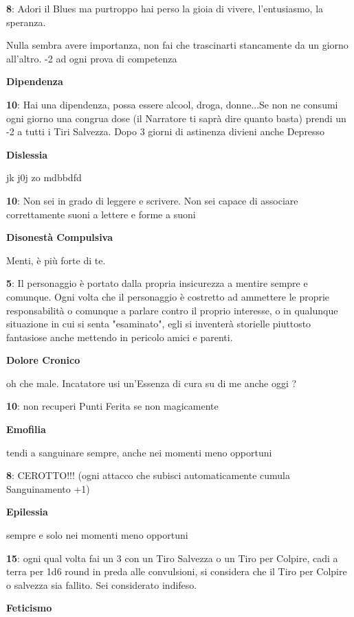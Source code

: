 \documentclass[a4paper,11pt,twoside,openany]{book}
\begin{document}
\textbf{8}: Adori il Blues ma purtroppo hai perso la gioia di vivere, l'entusiasmo, la speranza.

Nulla sembra avere importanza, non fai che trascinarti stancamente da un giorno all'altro. -2 ad ogni prova di competenza

\textbf{Dipendenza}

\textbf{10}: Hai una dipendenza, possa essere alcool, droga, donne...Se non ne consumi ogni giorno una congrua dose (il Narratore ti saprà dire quanto basta) prendi un -2 a tutti i Tiri Salvezza. Dopo 3 giorni di astinenza divieni anche Depresso

\textbf{Dislessia}

jk j0j zo mdbbdfd

\textbf{10}: Non sei in grado di leggere e scrivere. Non sei capace di associare correttamente suoni a lettere e forme a suoni

\textbf{Disonestà Compulsiva}

Menti, è più forte di te.

\textbf{5}: Il personaggio è portato dalla propria insicurezza a mentire sempre e comunque. Ogni volta che il personaggio è costretto ad ammettere le proprie responsabilità o comunque a parlare contro il proprio interesse, o in qualunque situazione in cui si senta "esaminato", egli si inventerà storielle piuttosto fantasiose anche mettendo in pericolo amici e parenti.

\textbf{Dolore Cronico}

oh che male. Incatatore usi un'Essenza di cura su di me anche oggi ?

\textbf{10}: non recuperi Punti Ferita se non magicamente

\textbf{Emofilia}

tendi a sanguinare sempre, anche nei momenti meno opportuni

\textbf{8}: CEROTTO!!! (ogni attacco che subisci automaticamente cumula Sanguinamento +1)

\textbf{Epilessia}

sempre e solo nei momenti meno opportuni

\textbf{15}: ogni qual volta fai un 3 con un Tiro Salvezza o un Tiro per Colpire, cadi a terra per 1d6 round in preda alle convulsioni, si considera che il Tiro per Colpire o salvezza sia fallito. Sei considerato indifeso.

\textbf{Feticismo}
\end{document}
